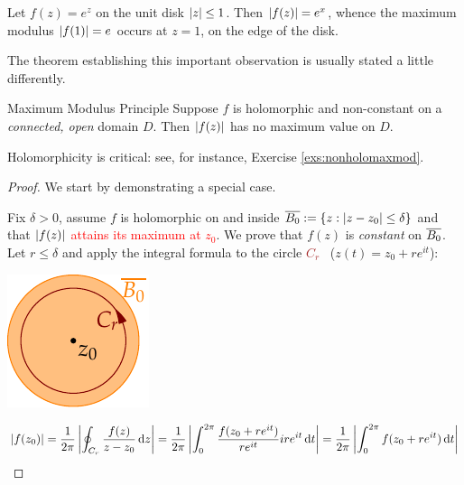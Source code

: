 \begin{example}{}{}
	Let $f(z)=e^z$ on the unit disk $\left| z\right|\le 1$. Then $\left| f(z)\right|=e^x$, whence the maximum modulus $\left| f(1)\right|=e$ occurs at $z=1$, on the edge of the disk.
\end{example}

The theorem establishing this important observation is usually stated a little differently.

\begin{thm}{Maximum Modulus Principle}{}
	Suppose $f$ is holomorphic and non-constant on a \emph{connected, open} domain $D$. Then $\left| f(z)\right|$ has no maximum value on $D$.
\end{thm}

Holomorphicity is critical: see, for instance, Exercise \ref{exs:nonholomaxmod}.

\begin{proof}
	We start by demonstrating a special case.\par
	\begin{minipage}[t]{0.79\linewidth}\vspace{-6pt}
		Fix $\delta>0$, assume $f$ is holomorphic on and inside $\overline{B_0}:=\{z:\left| z-z_0\right|\le\delta\}$ and that \textcolor{red}{$\left| f(z)\right|$ attains its maximum at $z_0$}. We prove that $f(z)$ is \emph{constant} on $\overline{B_0}$.\smallbreak
		Let $r\le\delta$ and apply the integral formula to the circle \textcolor{Brown}{$C_{r}$} \ ($z(t)=z_0+re^{it}$):
	\end{minipage}
	\hfill
	\begin{minipage}[t]{0.2\linewidth}\vspace{-21pt}
		\flushright\includegraphics[scale=0.95]{maxmod2}
	\end{minipage}\par
	\vspace{-10pt}
	\begin{align*}
		\nm{f(z_0)}
		&=\frac 1{2\pi}\nm{\oint_{C_{r}}\frac{f(z)}{z-z_0}\,\dz}
		=\frac 1{2\pi}\nm{\int_0^{2\pi}\frac{f(z_0+r e^{it})}{r e^{it}}ir e^{it}\,\dt}
		=\frac 1{2\pi}\nm{\int_0^{2\pi}f(z_0+r e^{it})\,\dt}\\

\end{align*}
\end{proof}
